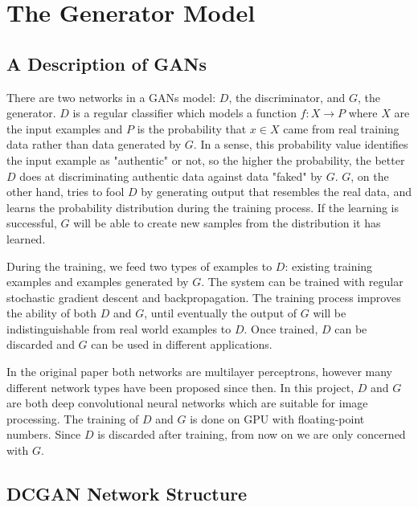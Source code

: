 
\chapter{The Generator Model}

\section{A Description of GANs}

There are two networks in a GANs model: $D$, the discriminator, and $G$, the generator. $D$ is a regular
classifier which models a function $f: X \rightarrow P$ where $X$ are the input examples and $P$ is the
probability that $x \in X$ came from real training data rather than data generated by $G$. In a sense,
this probability value identifies the input example as "authentic" or not, so the higher the probability,
the better $D$ does at discriminating authentic data against data "faked" by $G$. $G$, on the other hand,
tries to fool $D$ by generating output that resembles the real data, and learns the probability distribution
during the training process. If the learning is successful, $G$ will be able to create new samples from
the distribution it has learned.


During the training, we feed two types of examples to $D$: existing training examples and examples generated
by $G$. The system can be trained with regular stochastic gradient descent and backpropagation. The training
process improves the ability of both $D$ and $G$, until eventually the output of $G$ will be
indistinguishable from real world examples to $D$. Once trained, $D$ can be discarded and $G$ can be used
in different applications.

In the original paper both networks are multilayer perceptrons, however many different network types have been
proposed since then. In this project, $D$ and $G$ are both deep convolutional neural networks which are
suitable for image processing. The training of $D$ and $G$ is done on GPU with floating-point numbers. Since
$D$ is discarded after training, from now on we are only concerned with $G$.

\section{DCGAN Network Structure}

